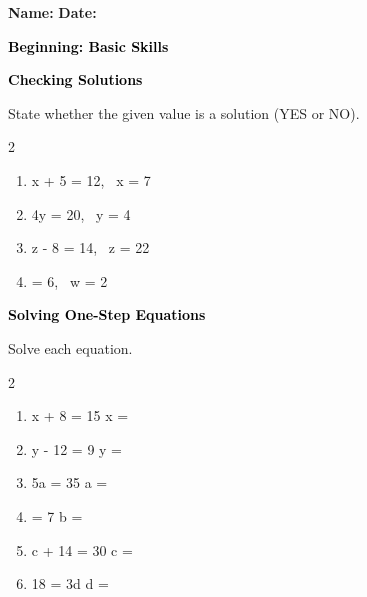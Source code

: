 \documentclass[12pt, letterpaper, fleqn]{article}
\newcommand{\blank}{\underline{\hspace{2.2cm}}}
\begin{document}
\textbf{Name:} \underline{\hspace{5cm}}
\hfill
\textbf{Date:} \underline{\hspace{3cm}}\\

\begin{tcolorbox}[colback=customteal!20]
    \large\textcolor{black}{\textbf{Beginning: Basic Skills}}
\end{tcolorbox}

\vspace{3mm}

\begin{tcolorbox}[colback=customteal!20]
\large\textcolor{black}{\textbf{Checking Solutions}}
\end{tcolorbox}

\noindent
State whether the given value is a solution (YES or NO).

\vspace{3mm}
\begin{multicols}{2}
\begin{enumerate}[itemsep=1cm, leftmargin=0.6cm]
\item x + 5 = 12, \ x = 7 \quad \rightarrow \quad \blank
\item 4y = 20, \ y = 4 \quad \rightarrow \quad \blank
\item z - 8 = 14, \ z = 22 \quad \rightarrow \quad \blank
\item {} = 6, \ w = 2 \quad \rightarrow \quad \blank
\end{enumerate}
\end{multicols}
\newpage

\begin{tcolorbox}[colback=customteal!20]
\large\textcolor{black}{\textbf{Solving One-Step Equations}}
\end{tcolorbox}

\noindent
Solve each equation.

\vspace{3mm}
\begin{multicols}{2}
\begin{enumerate}[itemsep=1cm, leftmargin=0.6cm]
\item x + 8 = 15 \quad \rightarrow \quad x = \blank
\item y - 12 = 9 \quad \rightarrow \quad y = \blank
\item 5a = 35 \quad \rightarrow \quad a = \blank
\item {} = 7 \quad \rightarrow \quad b = \blank
\item c + 14 = 30 \quad \rightarrow \quad c = \blank
\item 18 = 3d \quad \rightarrow \quad d = \blank
\end{enumerate}
\end{multicols}
\newpage
\end{document}
